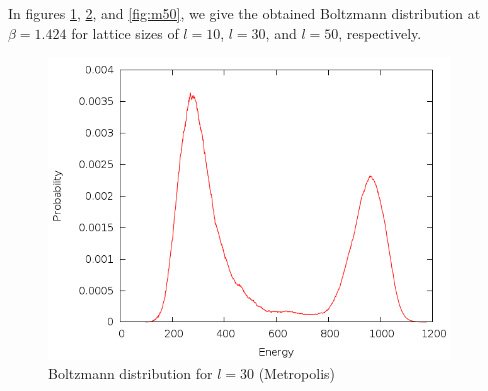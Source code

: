 \documentclass{article}
\begin{document}
In figures \ref{fig:m10}, \ref{fig:m30}, and \ref{fig:m50}, we give the obtained Boltzmann distribution at $\beta = 1.424$ for lattice sizes of $l = 10$, $l = 30$, and $l = 50$, respectively.

\begin{figure}[h]
\centering
{}
\label{fig:m10}
\end{figure}

\begin{figure}[h]
\includegraphics[height=8cm]{../results/metropolis/m30.png}
\caption{Boltzmann distribution for $l = 30$ (Metropolis)}
\label{fig:m30}
\end{figure}
\end{document}

